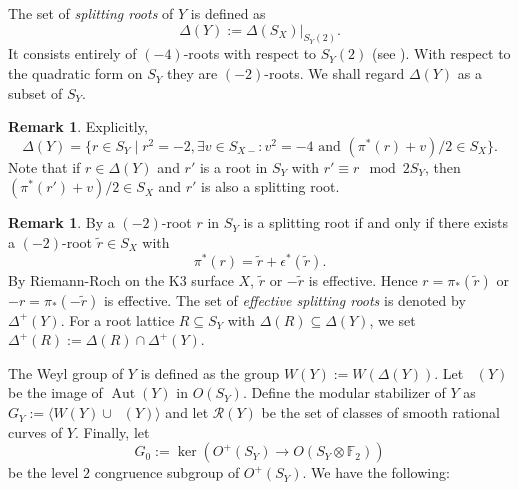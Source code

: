 \documentclass[a4paper]{amsart}
\theoremstyle{definition}
\newtheorem{remark}[definition]{Remark}
\theoremstyle{plain}
\DeclareMathOperator{\Aut}{Aut}
\DeclareMathOperator{\aut}{Aut^*}
\newcommand{\FF}{\mathbb{F}}
\newcommand{\R}{\mathcal{R}}
\begin{document}
The set of \emph{splitting roots} of $Y$ is defined as 
\[\Delta(Y):=\Delta(S_X)|_{S_Y(2)}.\]
It consists entirely of $(-4)$-roots with respect to $S_Y(2)$ (see ). 
With respect to the quadratic form on $S_Y$ they are $(-2)$-roots.  We shall regard $\Delta(Y)$ as a subset of $S_Y$.
\begin{remark} \label{rmk:splitting}
Explicitly, 
\begin{equation}\label{eqn:splitting}
     \Delta(Y)=\{r \in S_Y \mid r^2=-2, \exists v \in S_{X-}: v^2=-4 \mbox{ and } (\pi^*(r)+v)/2 \in S_X\}.
\end{equation}
Note that if $r\in\Delta(Y)$ and $r'$ is a root in $S_Y$ with $r' \equiv r \mod 2S_Y$, then $(\pi^*(r')+v)/2 \in S_X$ and $r'$ is also a splitting root.
\end{remark}
\begin{remark}
By \cite[Lemma 3.3, Lemma 3.4]{brandhorst-gonzalez:527} a $(-2)$-root $r$ in $S_Y$ is a splitting root if and only if there exists a $(-2)$-root $\widetilde{r}\in S_X$ with 
\[\pi^*(r) = \widetilde{r} + \epsilon^*(\widetilde{r}).\]
By Riemann-Roch on the K3 surface $X$, $\widetilde{r}$ or $-\widetilde{r}$ is effective. Hence $r = \pi_*(\widetilde{r})$ or $-r = \pi_*(-\widetilde{r})$ is effective. The set of \emph{effective splitting roots} is denoted by $\Delta^+(Y)$.  For a root lattice $R \subseteq S_Y$ with $\Delta(R) \subseteq \Delta(Y)$, we set $\Delta^+(R):=\Delta(R)\cap \Delta^+(Y)$.
\end{remark}
The Weyl group of $Y$ is defined as the group $W(Y):=W(\Delta(Y))$. 
Let $\aut(Y)$ be the image of $\Aut(Y)$ in $O(S_Y)$.
Define the modular stabilizer of $Y$ as $G_Y:= \langle W(Y) \cup \aut(Y)\rangle $ and let $\R(Y)$ be the set of classes of smooth rational curves of $Y$. Finally, let 
\[G_0:=\ker\left(O^+(S_Y) \to O(S_Y\otimes \FF_2)\right)\] 
be the level $2$ congruence subgroup of $O^+(S_Y)$.
We have the following:
\end{document}
